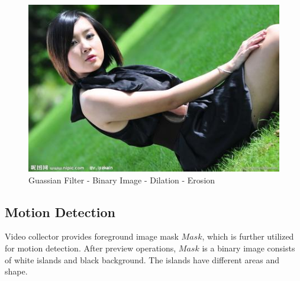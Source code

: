 \documentclass[conference]{IEEEtran}
\begin{document}
	\begin{figure}[!h]
	\centering
	\includegraphics[width=1\linewidth]{figures/jena.jpg} 
	\caption{Guassian Filter - Binary Image - Dilation - Erosion}
	\label{fig:preDetection}
	\end{figure}
			
		
	\subsection{Motion Detection}
	Video collector provides foreground image mask $Mask$, which is further utilized for motion detection. After preview operations, $Mask$ is a binary image consists of white islands and black background. The islands have different areas and shape.	
	
\end{document}
